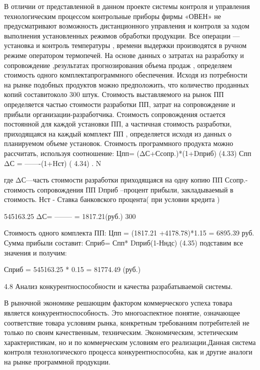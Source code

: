 \begin{ESKDexplanation}
\begin{ESKDexplanation}
\begin{ESKDexplanation}
\begin{ESKDexplanation}
В отличии от представленной в данном проекте системы контроля и управления 
технологическим процессом контрольные приборы фирмы «ОВЕН» не
предусматривают возможность дистанционного управления и контроля за ходом выполнения установленных режимов обработки продукции.
Все операции — установка и контроль температуры , времени выдержки 
производятся в ручном режиме оператором термопечей. На основе данных  о затратах на разработку и сопровождение ,результатах прогнозирования объема продаж  , определяем стоимость одного комплектапрограммного обеспечения. Исходя из потребности на рынке подобных продуктов можно предположить, что количество проданных копий составитоколо 300 штук. Стоимость выставляемого на рынок ПП определяется частью стоимости разработки ПП, затрат на сопровождение и прибыли организации-разработчика. Стоимость сопровождения остается постоянной для каждой установки ПП, а частичная стоимость разработки, приходящаяся на каждый комплект ПП , определяется исходя из данных о планируемом объеме установок.
Стоимость программного продукта можно рассчитать, используя соотношение:
                                 Цпп= (ΔС+Ссопр.)*(1+Dприб)                                 (4.33)
                                   Спп
                                  ΔС =  -------(1+Hст)                                                            ( 4.34)                                                                             .                                              N
                                                       
 где ΔС—часть стоимости разработки приходящаяся на одну копию ПП
Ссопр.- стоимость сопровождения ПП
Dприб –процент прибыли, закладываемый в стоимость.
Нст -  Ставка банковского процента( при условии кредита )

                                     545163.25
                            ΔС=    --------    =  1817.21(руб.)
                                          300

Стоимость одного комплекта ПП:
Цпп = (1817.21 +4178.78)*1.15  =  6895.39 руб.
Сумма прибыли составит:
Сприб= Спп* Dприб(1-Нндс)                                                            (4.35)
подставим все значения и получим:

Сприб = 545163.25 * 0.15 =  81774.49 (руб.)



4.8  Анализ конкурентноспособности и качества   разрабатываемой                          
        системы.

В рыночной экономике решающим фактором коммерческого успеха товара является конкурентноспособность. Это многоаспектное понятие, означающее 
соответствие товара условиям рынка, конкретным требованиям потребителей
не только по своим качественным, техническим. Экономическим, эстетическим
характеристикам, но и по коммерческим условиям его реализации.Данная 
система контроля технологического процесса конкурентноспособна, как и 
другие аналоги на рынке программной продукции.


\end{ESKDexplanation}
\end{ESKDexplanation}
\end{ESKDexplanation}
\end{ESKDexplanation}
